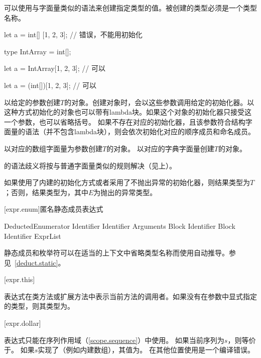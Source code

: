 \pnum
可以使用与字面量类似的语法来创建指定类型的值。被创建的类型必须是一个类型名称。

\enterexample
\begin{codeblock}

let a = int[] [1, 2, 3]; // 错误，不能用\tcode{[]}初始化

type IntArray = int[];

let a = IntArray[1, 2, 3]; // 可以

let a = (int[])[1, 2, 3]; // 可以

\end{codeblock}
\exitexample

\pnum
{}以给定的参数创建$T$的对象。创建对象时，会以这些参数调用给定的初始化器。以这种方式初始化的对象也可以带有lambda块。如果这个对象的初始化器只接受这一个参数，也可以省略括号。
如果不存在对应的初始化器，且该参数符合结构字面量的语法（并不包含lambda块），则会依次初始化对应的顺序成员和命名成员。

\pnum
{}以对应的数组字面量为参数创建$T$的对象。
以对应的字典字面量创建$T$的对象。

\pnum
{}的语法歧义将按与普通字面量类似的规则解决（见上）。

\pnum
如果使用了内建的初始化方式或者采用了不抛出异常的初始化器，则结果类型为$T$；否则，结果类型为，其中$E$为抛出的异常类型。

[expr.enum]{匿名静态成员表达式}

\begin{bnf}{DeductedEnumerator}
     Identifier \br
     Identifier \terminal{(} Arguments\bnfq \terminal{)} Block\bnfs \br
     Identifier Block \br
     Identifier \terminal{[} ExprList\bnfq \terminal{]}
\end{bnf}

\pnum
静态成员和枚举符可以在适当的上下文中省略类型名称而使用自动推导。参见~\ref{deduct.static}。

[expr.this]{}

\pnum
表达式在类方法或扩展方法中表示当前方法的调用者。如果没有在参数中显式指定的类型，则其类型为。

[expr.dollar]{\tcode{\$}}

\pnum
表达式\tcode{\$}只能在序列作用域（\ref{scope.sequence}）中使用。
如果当前序列为$s$，则\tcode{\$}等价于。
如果$s$实现了（例如内建数组），其值为。
在其他位置使用\tcode{\$}是一个编译错误。

